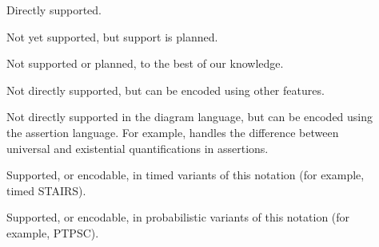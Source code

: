 \begin{description}
\item[\OK] Directly supported.
\item[\SOON] Not yet supported, but
  support is planned.
\item[\NO] Not supported or planned, to the best of our knowledge.
\item[\ISH] Not directly supported, but can be encoded using other
  features.
\item[\ASST] Not directly supported in the
  diagram language, but can be encoded using the
  assertion language.  For example, \langname{} handles
  the difference between universal and existential
  quantifications in assertions.
\item[\INTIMED] Supported, or encodable, in timed variants of this
  notation (for example, timed STAIRS).
\item[\INPROB] Supported, or encodable, in
  probabilistic variants of this
  notation (for example, PTPSC).
\end{description}


